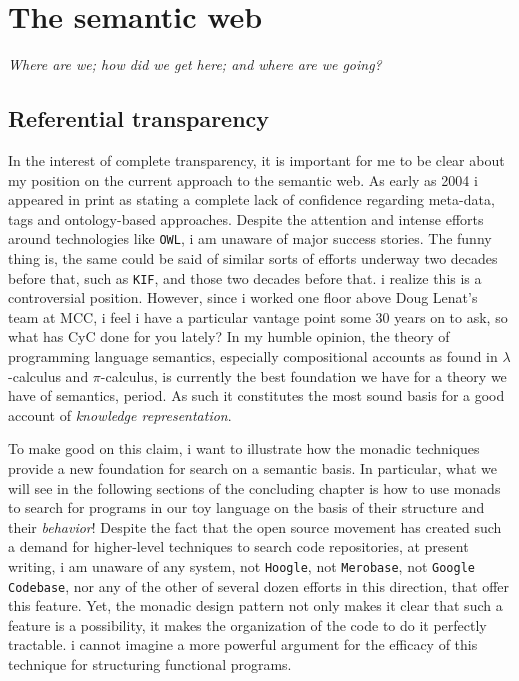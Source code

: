 

\chapter{The semantic web}
\begin{center}
{\small\em Where are we; how did we get here; and where are we going?}
\end{center}

\section{Referential transparency}

In the interest of complete transparency, it is important for me to be
clear about my position on the current approach to the semantic
web. As early as 2004 i appeared in print as stating a complete lack
of confidence regarding meta-data, tags and ontology-based
approaches. Despite the attention and intense efforts around
technologies like \texttt{OWL}, i am unaware of major success
stories. The funny thing is, the same could be said of similar sorts
of efforts underway two decades before that, such as \texttt{KIF}, and
those two decades before that. i realize this is a controversial
position. However, since i worked one floor above Doug Lenat's team at
MCC, i feel i have a particular vantage point some 30 years on to ask,
so what has CyC done for you lately? In my humble opinion, the theory
of programming language semantics, especially compositional accounts
as found in $\lambda$-calculus and $\pi$-calculus, is currently the
best foundation we have for a theory we have of semantics, period.  As
such it constitutes the most sound basis for a good account of
\emph{knowledge representation}.

To make good on this claim, i want to illustrate how the monadic
techniques provide a new foundation for search on a semantic basis. In
particular, what we will see in the following sections of the
concluding chapter is how to use monads to search for programs in our
toy language on the basis of their structure and their
\emph{behavior}! Despite the fact that the open source movement has
created such a demand for higher-level techniques to search code
repositories, at present writing, i am unaware of any system, not
\texttt{Hoogle}, not \texttt{Merobase}, not \texttt{Google Codebase},
nor any of the other of several dozen efforts in this direction, that
offer this feature. Yet, the monadic design pattern not only makes it
clear that such a feature is a possibility, it makes the organization
of the code to do it perfectly tractable. i cannot imagine a more
powerful argument for the efficacy of this technique for structuring
functional programs.

